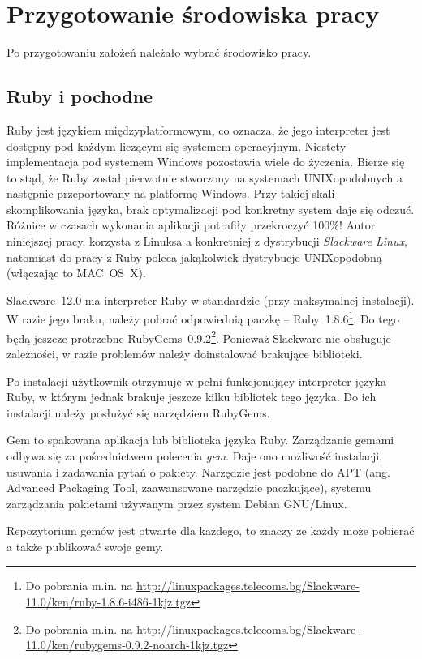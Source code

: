 \documentclass[a4paper,12pt,oneside]{report}
\begin{document}
\section{Przygotowanie środowiska pracy}
\label{sec:srodowisko}
Po przygotowaniu założeń należało wybrać środowisko pracy.

\subsection{Ruby i pochodne}
\label{sub:ruby-etc}
Ruby jest językiem międzyplatformowym, co oznacza, że jego interpreter jest dostępny pod każdym liczącym się systemem operacyjnym. Niestety implementacja pod systemem Windows pozostawia wiele do życzenia. Bierze się to stąd, że Ruby został pierwotnie stworzony na systemach UNIXopodobnych a następnie przeportowany na platformę Windows. Przy takiej skali skomplikowania języka, brak optymalizacji pod konkretny system daje się odczuć. Różnice w czasach wykonania aplikacji potrafiły przekroczyć 100\%! Autor niniejszej pracy, korzysta z Linuksa a konkretniej z dystrybucji \emph{Slackware Linux}, natomiast do pracy z Ruby poleca jakąkolwiek dystrybucje UNIXopodobną (włączając to MAC~OS~X).

Slackware~12.0 ma interpreter Ruby w standardzie (przy maksymalnej instalacji). W razie jego braku, należy pobrać odpowiednią paczkę -- Ruby~1.8.6\footnote{Do pobrania m.in. na \url{http://linuxpackages.telecoms.bg/Slackware-11.0/ken/ruby-1.8.6-i486-1kjz.tgz}}. Do tego będą jeszcze protrzebne RubyGems~0.9.2\footnote{Do pobrania m.in. na \url{http://linuxpackages.telecoms.bg/Slackware-11.0/ken/rubygems-0.9.2-noarch-1kjz.tgz}}. Ponieważ Slackware nie obsługuje zależności, w razie problemów należy doinstalować brakujące biblioteki.

Po instalacji użytkownik otrzymuje w pełni funkcjonujący interpreter języka Ruby, w którym jednak brakuje jeszcze kilku bibliotek tego języka. Do ich instalacji należy posłużyć się narzędziem RubyGems.

Gem to spakowana aplikacja lub biblioteka języka Ruby. Zarządzanie gemami odbywa się za pośrednictwem polecenia \emph{gem}. Daje ono możliwość instalacji, usuwania i zadawania pytań o pakiety. Narzędzie jest podobne do APT (ang. Advanced Packaging Tool, zaawansowane narzędzie paczkujące), systemu zarządzania pakietami używanym przez system Debian GNU/Linux.

Repozytorium gemów jest otwarte dla każdego, to znaczy że każdy może pobierać a także publikować swoje gemy.
\end{document}
